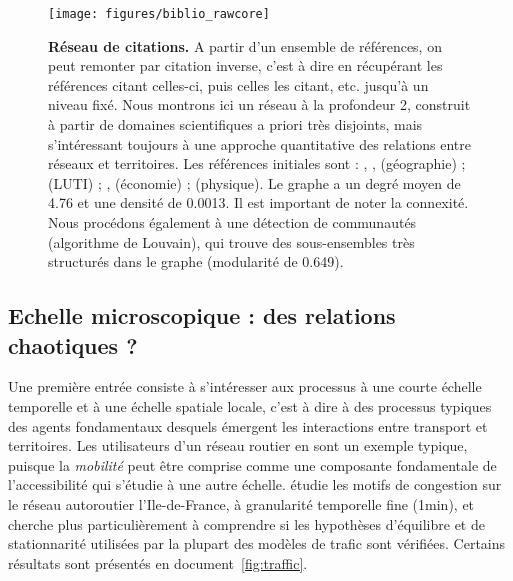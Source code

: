 \begin{figure}
\phantom{}\hspace{-2.6cm}
\texttt{[image: figures/biblio\_rawcore]}
\caption{\textbf{Réseau de citations.} A partir d'un ensemble de références, on peut remonter par citation inverse, c'est à dire en récupérant les références citant celles-ci, puis celles les citant, etc. jusqu'à un niveau fixé. Nous montrons ici un réseau à la profondeur 2, construit à partir de domaines scientifiques a priori très disjoints, mais s'intéressant toujours à une approche quantitative des relations entre réseaux et territoires. Les références initiales sont : \cite{offner1996reseaux}, \cite{bretagnolle:tel-00459720}, \cite{offner1993effets} (géographie) ; \cite{wegener2004land} (LUTI) ; \cite{levinson2007co}, \cite{xie2009modeling} (économie) ; \cite{barthelemy2009co} (physique). Le graphe a un degré moyen de 4.76 et une densité de 0.0013. Il est important de noter la connexité. Nous procédons également à une détection de communautés (algorithme de Louvain), qui trouve des sous-ensembles très structurés dans le graphe (modularité de 0.649).}
\label{fig:citnw}
\end{figure}





\subsection{Echelle microscopique : des relations chaotiques ?}

Une première entrée consiste à s'intéresser aux processus à une courte échelle temporelle et à une échelle spatiale locale, c'est à dire à des processus typiques des agents fondamentaux desquels émergent les interactions entre transport et territoires. Les utilisateurs d'un réseau routier en sont un exemple typique, puisque la \emph{mobilité} peut être comprise comme une composante fondamentale de l'accessibilité qui s'étudie à une autre échelle. \cite{raimbault2016investigating} étudie les motifs de congestion sur le réseau autoroutier l'Ile-de-France, à granularité temporelle fine (1min), et cherche plus particulièrement à comprendre si les hypothèses d'équilibre et de stationnarité utilisées par la plupart des modèles de trafic sont vérifiées. Certains résultats sont présentés en document~\ref{fig:traffic}.

\medskip


